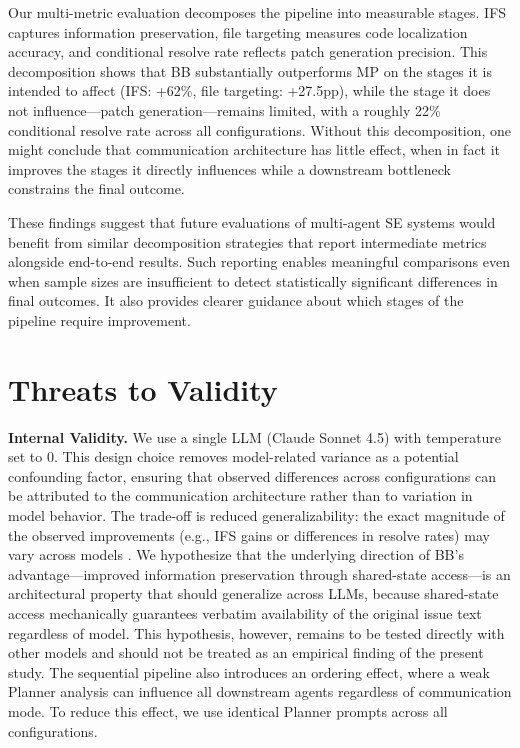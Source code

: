 \documentclass{ieeeaccess}
\begin{document}
Our multi-metric evaluation decomposes the pipeline into measurable stages. IFS captures information preservation, file targeting measures code localization accuracy, and conditional resolve rate reflects patch generation precision. This decomposition shows that BB substantially outperforms MP on the stages it is intended to affect (IFS: +62\%, file targeting: +27.5pp), while the stage it does not influence---patch generation---remains limited, with a roughly 22\% conditional resolve rate across all configurations. Without this decomposition, one might conclude that communication architecture has little effect, when in fact it improves the stages it directly influences while a downstream bottleneck constrains the final outcome.

These findings suggest that future evaluations of multi-agent SE systems would benefit from similar decomposition strategies that report intermediate metrics alongside end-to-end results. Such reporting enables meaningful comparisons even when sample sizes are insufficient to detect statistically significant differences in final outcomes. It also provides clearer guidance about which stages of the pipeline require improvement.

\section{Threats to Validity}
\label{sec:threats}

\textbf{Internal Validity.} We use a single LLM (Claude Sonnet 4.5) with temperature set to 0. This design choice removes model-related variance as a potential confounding factor, ensuring that observed differences across configurations can be attributed to the communication architecture rather than to variation in model behavior. The trade-off is reduced generalizability: the exact magnitude of the observed improvements (e.g., IFS gains or differences in resolve rates) may vary across models \cite{brown2020language}. We hypothesize that the underlying direction of BB's advantage---improved information preservation through shared-state access---is an architectural property that should generalize across LLMs, because shared-state access mechanically guarantees verbatim availability of the original issue text regardless of model. This hypothesis, however, remains to be tested directly with other models and should not be treated as an empirical finding of the present study. The sequential pipeline also introduces an ordering effect, where a weak Planner analysis can influence all downstream agents regardless of communication mode. To reduce this effect, we use identical Planner prompts across all configurations.
\end{document}
